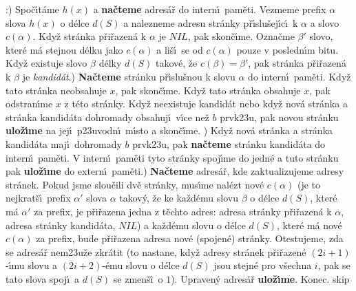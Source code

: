 :) Spo\v c\'\i t\'ame $h\left(x\right)$ a {\bf na\v cteme} adres\'a\v r do intern\'\i\ pam\v eti. 
Vez\-me\-me prefix $\alpha$ slova $h\left(x\right)$ o d\'elce $d\left(S\right)$ a nalezneme 
adresu str\'anky p\v r\'\i slu\v sej\'\i c\'\i\ k $\alpha$ a slovo $
c\left(\alpha \right)$. 
Kdy\v z str\'anka p\v ri\v razen\'a k $\alpha$ je $NIL$, pak skon\v c\'\i me. 
Ozna\v cme $\beta'$ slovo, kter\'e m\'a stejnou d\'elku jako $c\left(\alpha 
\right)$ a 
li\v s\'\i\ se od $c\left(\alpha \right)$ pouze v posledn\'\i m bitu. Kdy\v z existuje 
slovo $\beta$ d\'elky $d\left(S\right)$ takov\'e, \v ze $c\left(\beta \right)=\beta'$, pak str\'anka 
p\v ri\v razen\'a k $\beta$ je \emph{kandid\'at}.) {\bf Na\v cteme} str\'anku p\v r\'\i slu\v snou k slovu $\alpha$ do intern\'\i\ 
pam\v eti. Kdy\v z tato str\'anka neobsahuje $x$, pak skon\v c\'\i me. 
Kdy\v z tato str\'anka obsahuje $x$, pak odstran\'\i me $x$ z t\'eto 
str\'anky. Kdy\v z neexistuje kandid\'at nebo kdy\v z nov\'a 
str\'anka a str\'anka kandid\'ata dohromady obsahuj\'\i\ v\'\i ce ne\v z $
b$ 
prvk\accent23u, pak novou str\'anku {\bf ulo\-\v z\'\i me} na jej\'\i\ 
p\accent23uvodn\'\i\ m\'\i sto a skon\v c\'\i me. \newline 
3) Kdy\v z nov\'a str\'anka a str\'anka kandid\'ata maj\'\i\ 
dohromady $b$ prvk\accent23u, pak {\bf na\v cteme} str\'anku 
kandid\'ata do intern\'\i\ pam\v eti. V intern\'\i\ pam\v eti tyto 
str\'anky spoj\'\i me do jedn\'e a tuto str\'anku pak 
{\bf ulo\-\v z\'\i me} do extern\'\i\ pam\v eti.\newline 
4) {\bf Na\v cteme} adres\'a\v r, kde zaktualizujeme adresy 
str\'anek. Po\-kud jsme slou\v cili dv\v e str\'anky, mus\'\i me nal\'ezt 
nov\'e $c\left(\alpha \right)$ (je to nejkrat\v s\'\i\ prefix $\alpha'$ slova $
\alpha$ takov\'y, \v ze 
ke ka\v zd\'emu slovu $\beta$ o d\'elce $d\left(S\right)$, kter\'e m\'a $\alpha'$ za prefix, 
je p\v ri\v razena jedna z t\v echto adres: adresa str\'anky 
p\v ri\v razen\'a k $\alpha$, adresa str\'anky kandid\'ata, $NIL$) a ka\v zd\'emu 
slovu o d\'elce $d\left(S\right)$, kter\'e m\'a nov\'e $c\left(\alpha \right)$ za prefix, bude 
p\v ri\v razena adresa nov\'e (spojen\'e) str\'anky. Otestujeme, zda 
se adres\'a\v r nem\accent23u\v ze zkr\'atit (to nastane, kdy\v z 
adresy str\'anek p\v ri\v razen\'e $\left(2i+1\right)$-\'\i mu slovu a $\left(2i+
2\right)$-\'emu 
slovu o d\'elce $d\left(S\right)$ jsou stejn\'e pro v\v sechna $i$, 
pak se tato slova spoj\'\i\ a $d\left(S\right)$ se zmen\v s\'\i\ o $1$). Upraven\'y 
adres\'a\v r {\bf ulo\v z\'\i me}. Konec.
skip

